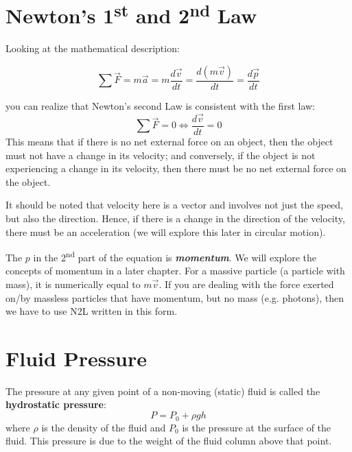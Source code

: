 \documentclass[11pt]{article}
\newcommand{\stoptocwriting}{%
	\addtocontents{toc}{\protect\setcounter{tocdepth}{-5}}}
\numberwithin{equation}{section}
\begin{document}
		\begin{appendices}
			\stoptocwriting
			\section{Newton's 1\textsuperscript{st} and 2\textsuperscript{nd} Law}
			\label{appdx:n12l}
			Looking at the mathematical description:
			
			\begin{equation}
			\sum\vec{F} = m\vec{a} = m\frac{d\vec{v}}{dt} = \frac{d(m\vec{v})}{dt} = \frac{d\vec{p}}{dt}
			\end{equation}
			
			you can realize that Newton's second Law is consistent with the first law: 
			\begin{equation}
			\sum \vec{F} = 0 \Leftrightarrow \frac{d\vec{v}}{dt} = 0
			\end{equation}
			This means that if there is no net external force on an object, then the object must not have a change in its velocity; and conversely, if the object is not experiencing a change in its velocity, then there must be no net external force on the object. 
			
			It should be noted that velocity here is a vector and involves not just the speed, but also the direction. Hence, if there is a change in the direction of the velocity, there must be an acceleration (we will explore this later in circular motion). 
			
			The $p$ in the 2\textsuperscript{nd} part of the equation is \textit{\textbf{momentum}}. We will explore the concepts of momentum in a later chapter. For a massive particle (a particle with mass), it is numerically equal to $m\vec{v}$. If you are dealing with the force exerted on/by massless particles that have momentum, but no mass (e.g. photons), then we have to use N2L written in this form.
			\pagebreak
			\section{Fluid Pressure}
			\label{appdx:fluidpressure}
			The pressure at any given point of a non-moving (static) fluid is called the \textbf{hydrostatic pressure}:
			\begin{equation}
				\label{eqn:appdx:fluidpressure}
				P = P_0 + \rho g h 
			\end{equation}
			where $\rho$ is the density of the fluid and $P_0$ is the pressure at the surface of the fluid. This pressure is due to the weight of the fluid column above that point.
			

\end{appendices}
\end{document}
